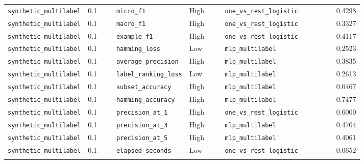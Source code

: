 \documentclass[11pt]{article}
\begin{document}
\begin{longtable}{p{0.18\linewidth} p{0.08\linewidth} p{0.20\linewidth} p{0.10\linewidth} p{0.25\linewidth} r}
\texttt{synthetic\_multilabel} & 0.1 & \texttt{micro\_f1} & High & \texttt{one\_vs\_rest\_logistic} & 0.4298 \\
\texttt{synthetic\_multilabel} & 0.1 & \texttt{macro\_f1} & High & \texttt{one\_vs\_rest\_logistic} & 0.3327 \\
\texttt{synthetic\_multilabel} & 0.1 & \texttt{example\_f1} & High & \texttt{one\_vs\_rest\_logistic} & 0.4117 \\
\texttt{synthetic\_multilabel} & 0.1 & \texttt{hamming\_loss} & Low & \texttt{mlp\_multilabel} & 0.2523 \\
\texttt{synthetic\_multilabel} & 0.1 & \texttt{average\_precision} & High & \texttt{mlp\_multilabel} & 0.3835 \\
\texttt{synthetic\_multilabel} & 0.1 & \texttt{label\_ranking\_loss} & Low & \texttt{mlp\_multilabel} & 0.2613 \\
\texttt{synthetic\_multilabel} & 0.1 & \texttt{subset\_accuracy} & High & \texttt{mlp\_multilabel} & 0.0467 \\
\texttt{synthetic\_multilabel} & 0.1 & \texttt{hamming\_accuracy} & High & \texttt{mlp\_multilabel} & 0.7477 \\
\texttt{synthetic\_multilabel} & 0.1 & \texttt{precision\_at\_1} & High & \texttt{one\_vs\_rest\_logistic} & 0.6000 \\
\texttt{synthetic\_multilabel} & 0.1 & \texttt{precision\_at\_3} & High & \texttt{mlp\_multilabel} & 0.4704 \\
\texttt{synthetic\_multilabel} & 0.1 & \texttt{precision\_at\_5} & High & \texttt{mlp\_multilabel} & 0.4061 \\
\texttt{synthetic\_multilabel} & 0.1 & \texttt{elapsed\_seconds} & Low & \texttt{one\_vs\_rest\_logistic} & 0.0652 \\
\addlinespace


\end{longtable}
\end{document}
